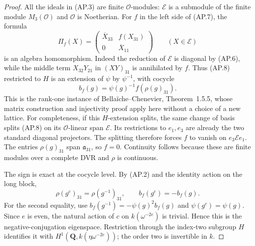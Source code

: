 \begin{proof}
All the ideals in (AP.3) are finite $\mathcal O$-modules:
$\mathcal E$ is a submodule of the finite module
$M_3(\mathcal O)$ and $\mathcal O$ is Noetherian.
For $f$ in the left side of (AP.7), the formula
\[
 \Pi_f(X)=
 \begin{pmatrix}
  \overline X_{33}&f(X_{31})\\0&\overline X_{11}
 \end{pmatrix}\qquad(X\in\mathcal E)                       \tag{AP.8}
\]
is an algebra homomorphism.  Indeed the reduction of
$\mathcal E$ is diagonal by (AP.6), while the middle term
$X_{32}Y_{21}$ in $(XY)_{31}$ is annihilated by $f$.
Thus (AP.8) restricted to $H$ is an extension of $\psi$
by $\psi^{-1}$, with cocycle
\[
             b_f(g)=\psi(g)^{-1}f(\rho(g)_{31}).           \tag{AP.9}
\]
This is the rank-one instance of Bella\"iche--Chenevier,
Theorem~1.5.5, whose matrix construction and injectivity
proof apply here without a choice of a new lattice.
For completeness, if this $H$-extension splits, the same
change of basis splits (AP.8) on its $\mathcal O$-linear
span $\mathcal E$.  Its restrictions to $e_1,e_3$ are
already the two standard diagonal projectors.  The splitting
therefore forces $f$ to vanish on $e_3\mathcal E e_1$.
The entries $\rho(g)_{31}$ span $\mathfrak a_{31}$, so
$f=0$.  Continuity follows because these are finite modules
over a complete DVR and $\rho$ is continuous.

The sign is exact at the cocycle level.  By (AP.2) and the
identity action on the long block,
\[
 \rho(g^c)_{31}=\rho(g^{-1})_{31},\qquad
 b_f(g^c)=-b_f(g).                                         \tag{AP.10}
\]
For the second equality, use
$b_f(g^{-1})=-\psi(g)^2b_f(g)$ and
$\psi(g^c)=\psi(g)$.  Since $e$ is even, the natural action
of $c$ on $k(\omega^{-2e})$ is trivial.  Hence this is the
negative-conjugation eigenspace.  Restriction through the
index-two subgroup $H$ identifies it with
$H^1(\mathbf Q,k(\eta\omega^{-2e}))$; the order two is
invertible in $k$.


\end{proof}
